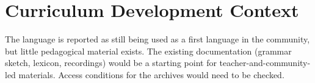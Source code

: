 \documentclass[12pt]{article}
\begin{document}
\section{Curriculum Development Context}
The language is reported as still being used as a first language in the community, but little pedagogical material exists. The existing documentation (grammar sketch, lexicon, recordings) would be a starting point for teacher-and-community-led materials. Access conditions for the archives would need to be checked.
\end{document}
